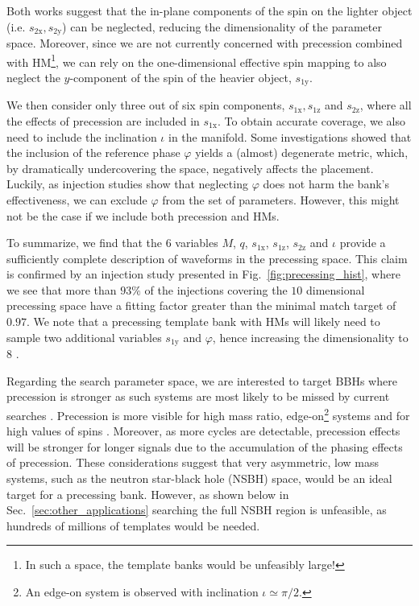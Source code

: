 \documentclass[twocolumn,showpacs,preprintnumbers,nofootinbib,prd,
superscriptaddress,10pt]{revtex4-2}
\begin{document}
Both works suggest that the in-plane components of the spin on the lighter object (i.e. $s_\text{2x}, s_\text{2y}$) can be neglected, reducing the dimensionality of the parameter space.
Moreover, since we are not currently concerned with precession combined with HM\footnote{In such a space, the template banks would be unfeasibly large!}, we can rely on the one-dimensional effective spin mapping \cite{Schmidt:2014iyl} to also neglect the $y$-component of the spin of the heavier object, $s_\text{1y}$.

We then consider only three out of six spin components, $s_\text{1x}, s_\text{1z}$ and $s_\text{2z}$, where all the effects of precession are included in $s_\text{1x}$. To obtain accurate coverage, we also need to include the inclination $\iota$ in the manifold.
Some investigations showed that the inclusion of the reference phase $\varphi$ yields a (almost) degenerate metric, which, by dramatically undercovering the space, negatively affects the placement.
Luckily, as injection studies show that neglecting $\varphi$ does not harm the bank's effectiveness, we can exclude $\varphi$ from the set of parameters. However, this might not be the case if we include both precession and HMs.

To summarize, we find that the $6$ variables $M$, $q$, $s_\text{1x}$, $s_\text{1z}$, $s_\text{2z}$ and $\iota$ provide a sufficiently complete description of waveforms in the precessing space.
This claim is confirmed by an injection study presented in Fig.~\ref{fig:precessing_hist}, where we see that more than $93\%$ of the injections covering the $10$ dimensional precessing space have a fitting factor greater than the minimal match target of $0.97$.
We note that a precessing template bank with HMs will likely need to sample two additional variables $s_\text{1y}$ and $\varphi$, hence increasing the dimensionality to $8$ \cite{Thomas:2020uqj}.

Regarding the search parameter space, we are interested to target BBHs where precession is stronger as such systems are most likely to be missed by current searches \cite{PhysRevD.102.041302, Fairhurst:2019vut}.
Precession is more visible for high mass ratio, edge-on\footnote{An edge-on system is observed with inclination $\iota\simeq \pi/2$.} systems and for high values of spins \cite{CalderonBustillo:2016rlt}. Moreover, as more cycles are detectable, precession effects will be stronger for longer signals due to the accumulation of the phasing effects of precession. These considerations suggest that very asymmetric, low mass systems, such as the neutron star-black hole (NSBH) space, would be an ideal target for a precessing bank. However, as shown below in Sec.~\ref{sec:other_applications} searching the full NSBH region is unfeasible, as hundreds of millions of templates would be needed.
\end{document}
